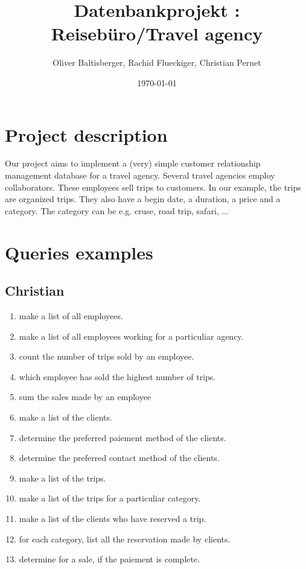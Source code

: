 \documentclass{article}
\title{Datenbankprojekt : Reisebüro/Travel agency}
\author{Oliver Baltisberger, Rachid Flueckiger, Christian Pernet}
\date{\today}
\begin{document}
	\maketitle
	
	\section*{Project description}
	Our project aims to implement a (very) simple customer relationship management 
	database for a travel agency. 
	Several travel agencies employ collaborators. These employees sell trips to 
	customers. 
	In our example, the trips are organized trips. They also have a begin date, a 
	duration, a price and a category. 
	The category can be e.g. cruse, road trip, safari, ...
	
	\section*{Queries examples}
	
	\subsection*{Christian}
			\begin{enumerate}
				\item make a list of all employees.
				\item make a list of all employees working for a particuliar agency.
				\item count the number of trips sold by an employee.
				\item which employee has sold the highest number of trips.
				\item sum the sales made by an employee
				\item make a list of the clients.
				\item determine the preferred paiement method of the clients.
				\item determine the preferred contact method of the clients.
				\item make a list of the trips.
				\item make a list of the trips for a particuliar category.
				\item make a list of the clients who have reserved a trip.
				\item for each category, list all the reservation made by clients.
				\item determine for a sale, if the paiement is complete.
			\end{enumerate}
	
\end{document}
